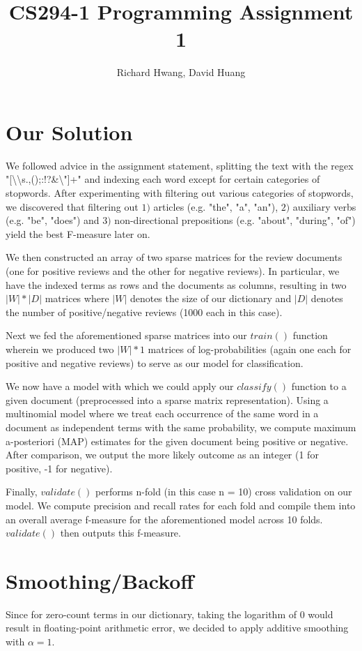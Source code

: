 \documentclass[11pt]{article}
\title{CS294-1 Programming Assignment 1}
\author{Richard Hwang, David Huang}
\begin{document}
\maketitle

\section{Our Solution}
We followed advice in the assignment statement, splitting the text with the regex "[\textbackslash \textbackslash s.,();:!?\&\textbackslash"]+" and indexing each word except for certain categories of stopwords.  After experimenting with filtering out various categories of stopwords, we discovered that filtering out $1)$ articles (e.g. "the", "a", "an"), $2)$ auxiliary verbs (e.g. "be", "does") and $3)$ non-directional prepositions (e.g. "about", "during", "of") yield the best F-measure later on.

We then constructed an array of two sparse matrices for the review documents (one for positive reviews and the other for negative reviews).  In particular, we have the indexed terms as rows and the documents as columns, resulting in two $|W| * |D|$ matrices where $|W|$ denotes the size of our dictionary and $|D|$ denotes the number of positive/negative reviews (1000 each in this case).

Next we fed the aforementioned sparse matrices into our $train()$ function wherein we produced two $|W| * 1$ matrices of log-probabilities (again one each for positive and negative reviews) to serve as our model for classification.

We now have a model with which we could apply our $classify()$ function to a given document (preprocessed into a sparse matrix representation).  Using a multinomial model where we treat each occurrence of the same word in a document as independent terms with the same probability, we compute maximum a-posteriori (MAP) estimates for the given document being positive or negative.  After comparison, we output the more likely outcome as an integer (1 for positive, -1 for negative).

Finally, $validate()$ performs n-fold (in this case n = 10) cross validation on our model.  We compute precision and recall rates for each fold and compile them into an overall average f-measure for the aforementioned model across 10 folds.  $validate()$ then outputs this f-measure.

\section{Smoothing/Backoff}
Since for zero-count terms in our dictionary, taking the logarithm of $0$ would result in floating-point arithmetic error, we decided to apply additive smoothing with $\alpha = 1$.
\end{document}
